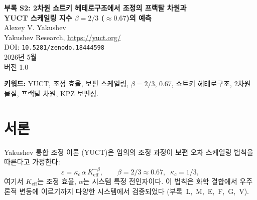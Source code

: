\documentclass[12pt,a4paper]{article}
\newcommand{\Keff}{K_{\mathrm{eff}}}
\theoremstyle{remark}
\begin{document}
	
	\begin{titlepage}
		\centering
		\vspace*{1cm}
		{\Huge\bfseries 부록 S2: 2차원 쇼트키 헤테로구조에서 조정의 프랙탈 차원과 \\ YUCT 스케일링 지수 $\beta = 2/3$ ($\approx 0.67$)의 예측}\\[1cm]
		{\large Alexey V. Yakushev}\\[0.3cm]
		{\normalsize Yakushev Research, \url{https://yuct.org/}}\\[1.5cm]
		{\normalsize DOI: \texttt{10.5281/zenodo.18444598}}\\[0.5cm]
		{\normalsize 2026년 5월\\버전 1.0}\\[2cm]
		
		\begin{minipage}{0.9\textwidth}
			\begin{abstract}
				\noindent
				Ang, Yang \& Ang (Phys. Rev. Lett. 121, 056802, 2018)은
				2차원 쇼트키 헤테로구조에서 보편적인 전류-온도 스케일링 법칙
				$\log(\mathcal{I}/T^{3/2}) \propto -1/T$ (측면 접촉) 및
				$\log(\mathcal{I}/T^{1}) \propto -1/T$ (운동량 비보존 수직 접촉)을
				발견했다. 본 부록에서는 두 지수가 수송을 제어하는 조정 네트워크의
				유효 프랙탈 차원 $d_f$에 의해 결정됨을 보여준다.
				YUCT 보편 오차 스케일링 법칙 $\varepsilon = \kappa_c\alpha
				K_{\mathrm{eff}}^{-\beta}$ ($\beta = 2/3 \approx 0.67$)은
				$\beta = 2/d_f$를 통해 $d_f$와 연결된다. 실험적 전류 스케일링으로부터
				측면 접촉에서는 $d_f = 3$, 수직 접촉에서는 $d_f = 2$를 추출하며,
				각각 $\beta = 2/3$ 및 $\beta = 1$을 제공한다. 이 분석은
				측면 쇼트키 다이오드에서 상대 전류 변동이
				$\varepsilon_{\mathrm{fluc}} \propto K_{\mathrm{eff}}^{-2/3}$을
				따를 것이라고 예측하며, 이는 표준 노이즈 분광법으로 검증 가능한
				반증 가능한 예측이다. 본 부록은 2차원 쇼트키 헤테로구조를
				보편적인 YUCT 지수 $\beta = 2/3$ ($0.67$)을 나타내거나 나타낼 것으로
				예측되는 계의 패밀리에 포함시켜, 이론의 적용 범위를 고체 나노전자공학
				영역으로 확장한다.
			\end{abstract}
			\vspace{1cm}
			\noindent\small\textbf{키워드:} YUCT, 조정 효율, 보편 스케일링,
			$\beta = 2/3$, 0.67, 쇼트키 헤테로구조, 2차원 물질,
			프랙탈 차원, KPZ 보편성.
		\end{minipage}
	\end{titlepage}
	
	\tableofcontents
	\newpage
	
	\section{서론}
	Yakushev 통합 조정 이론 (YUCT)은 임의의 조정 과정이 보편 오차 스케일링 법칙을
	따른다고 가정한다:
	\begin{equation}
		\varepsilon = \kappa_c \, \alpha \, \Keff^{-\beta},
		\qquad \beta = 2/3 \approx 0.67,\;\; \kappa_c = 1/3,
		\label{eq:yuct-law}
	\end{equation}
	여기서 $\Keff$는 조정 효율, $\alpha$는 시스템 특정 전인자이다.
	이 법칙은 화학 결합에서 우주론적 변동에 이르기까지 다양한 시스템에서
	검증되었다 (부록~L,~M,~E,~F,~G,~V).
	
\end{document}

